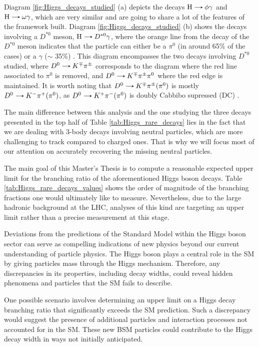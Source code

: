 Diagram \ref{fig:Higgs_decays_studied} (a) depicts the decays $\text{H}\decaysto \phi\gamma$ and $\text{H}\decaysto \omega\gamma$, which are very similar and are going to share a lot of the features of the framework built. Diagram \ref{fig:Higgs_decays_studied} (b) shows the decays involving a $D^{*0}$ meson, $\text{H}\decaysto D^{*0}\gamma$, where the orange line from the decay of the $D^{*0}$ meson indicates that the particle can either be a $\pi^{0}$ (in around 65\% of the cases) or a $\gamma$ ($\sim$ 35\%) \cite{PDG}. This diagram encompasses the two decays involving $D^{*0}$ studied, where $D^{0}\decaysto K^{\mp}\pi^{\pm}$ corresponds to the diagram where the red line associated to $\pi^{0}$ is removed, and $D^{0}\decaysto K^{\mp}\pi^{\pm}\pi^{0}$ where the red edge is maintained. It is worth noting that $D^{0}\decaysto K^{\mp}\pi^{\pm}(\pi^0)$ is mostly $D^{0}\decaysto K^{-}\pi^{+} (\pi^0)$, as $D^{0}\decaysto K^{+}\pi^{-} (\pi^0)$ is doubly Cabbibo supressed (DC) \cite{PDG}.

The main difference between this analysis and the one studying the three decays presented in the top half of Table \ref{tab:Higgs_rare_decays} lies in the fact that we are dealing with 3-body decays involving neutral particles, which are more challenging to track compared to charged ones. That is why we will focus most of our attention on accurately recovering the missing neutral particles.

The main goal of this Master's Thesis is to compute a reasonable expected upper limit for the branching ratio of the aforementioned Higgs boson decays. Table \ref{tab:Higgs_rare_decays_values} shows the order of magnitude of the branching fractions one would ultimately like to measure. Nevertheless, due to the large hadronic background at the LHC, analyses of this kind are targeting an upper limit rather than a precise measurement at this stage.

Deviations from the predictions of the Standard Model within the Higgs boson sector can serve as compelling indications of new physics beyond our current understanding of particle physics. The Higgs boson plays a central role in the SM by giving particles mass through the Higgs mechanism. Therefore, any discrepancies in its properties, including decay widths, could reveal hidden phenomena and particles that the SM fails to describe.

One possible scenario involves determining an upper limit on a Higgs decay branching ratio that significantly exceeds the SM prediction. Such a discrepancy would suggest the presence of additional particles and interaction processes not accounted for in the SM. These new BSM particles could contribute to the Higgs decay width in ways not initially anticipated.


